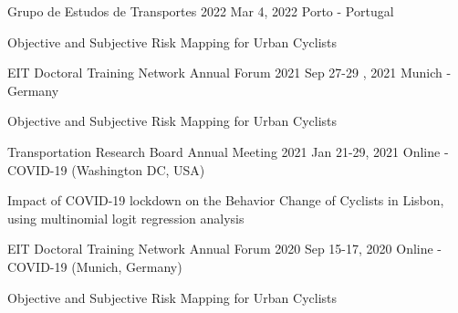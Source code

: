 \begin{cventries}
  \cventrypresentation
    {Grupo de Estudos de Transportes 2022} %
    {Mar 4, 2022} %
    {Porto - Portugal} %
    {
      \begin{cvpresentationitems} %
        \item {} {Objective and Subjective Risk Mapping for Urban Cyclists}
      \end{cvpresentationitems}
    }


  \cventrypresentation
    {EIT Doctoral Training Network Annual Forum 2021} %
    {Sep 27-29 , 2021} %
    {Munich - Germany} %
    {
      \begin{cvpresentationitems} %
        \item {} {Objective and Subjective Risk Mapping for Urban Cyclists}
      \end{cvpresentationitems}
    }


  \cventrypresentation
    {Transportation Research Board Annual Meeting 2021} %
    {Jan 21-29, 2021} %
    {Online - COVID-19 (Washington DC, USA)} %
    {
      \begin{cvpresentationitems} %
        \item {} {Impact of COVID-19 lockdown on the Behavior Change of Cyclists in Lisbon, using multinomial logit regression analysis}
      \end{cvpresentationitems}
    }


  \cventrypresentation
    {EIT Doctoral Training Network Annual Forum 2020} %
    {Sep 15-17, 2020} %
    {Online - COVID-19 (Munich, Germany)} %
    {
      \begin{cvpresentationitems} %
        \item {} {Objective and Subjective Risk Mapping for Urban Cyclists}
      \end{cvpresentationitems}
    }



\end{cventries}

